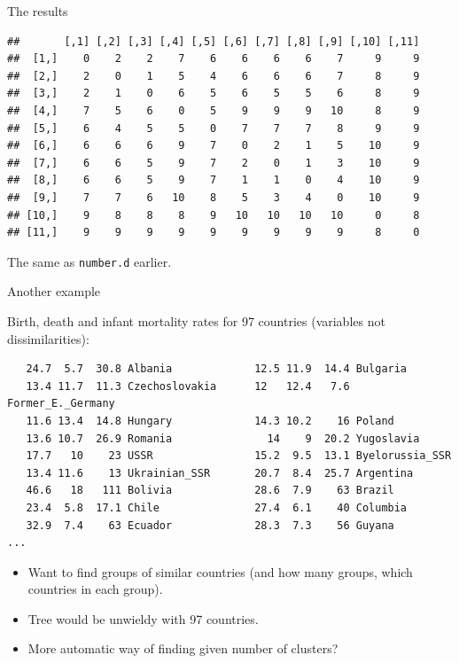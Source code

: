\begin{frame}[fragile]{The results}


  
  
{\footnotesize  
\begin{knitrout}
\color{fgcolor}\begin{kframe}
\begin{alltt}
\end{alltt}
\begin{verbatim}
##       [,1] [,2] [,3] [,4] [,5] [,6] [,7] [,8] [,9] [,10] [,11]
##  [1,]    0    2    2    7    6    6    6    6    7     9     9
##  [2,]    2    0    1    5    4    6    6    6    7     8     9
##  [3,]    2    1    0    6    5    6    5    5    6     8     9
##  [4,]    7    5    6    0    5    9    9    9   10     8     9
##  [5,]    6    4    5    5    0    7    7    7    8     9     9
##  [6,]    6    6    6    9    7    0    2    1    5    10     9
##  [7,]    6    6    5    9    7    2    0    1    3    10     9
##  [8,]    6    6    5    9    7    1    1    0    4    10     9
##  [9,]    7    7    6   10    8    5    3    4    0    10     9
## [10,]    9    8    8    8    9   10   10   10   10     0     8
## [11,]    9    9    9    9    9    9    9    9    9     8     0
\end{verbatim}
\end{kframe}
\end{knitrout}
}

The same as \texttt{number.d} earlier.
  
\end{frame}


\begin{frame}[fragile]{Another example}

Birth, death and infant mortality rates for 97 countries (variables not dissimilarities):

{\scriptsize
\begin{verbatim}
   24.7  5.7  30.8 Albania             12.5 11.9  14.4 Bulgaria
   13.4 11.7  11.3 Czechoslovakia      12   12.4   7.6 Former_E._Germany
   11.6 13.4  14.8 Hungary             14.3 10.2    16 Poland
   13.6 10.7  26.9 Romania               14    9  20.2 Yugoslavia
   17.7   10    23 USSR                15.2  9.5  13.1 Byelorussia_SSR
   13.4 11.6    13 Ukrainian_SSR       20.7  8.4  25.7 Argentina
   46.6   18   111 Bolivia             28.6  7.9    63 Brazil
   23.4  5.8  17.1 Chile               27.4  6.1    40 Columbia
   32.9  7.4    63 Ecuador             28.3  7.3    56 Guyana
...
\end{verbatim}
}

\begin{itemize}
\item Want to find groups of similar countries (and how many groups, which countries in each group).
\item Tree would be unwieldy with 97 countries.
\item More automatic way of finding given number of clusters?
\end{itemize}
  
\end{frame}

